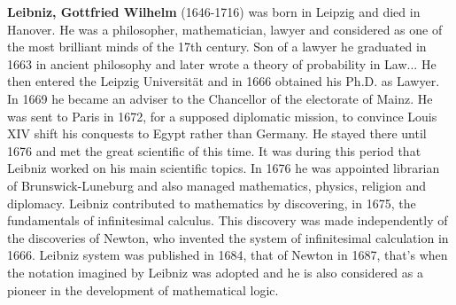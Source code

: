 \textbf{Leibniz, Gottfried Wilhelm} (1646-1716) was born in Leipzig and died in Hanover. He was a philosopher, mathematician, lawyer and considered as one of the most brilliant minds of the 17th century. Son of a lawyer he graduated in 1663 in ancient philosophy and later wrote a theory of probability in Law... He then entered the Leipzig Universität and in 1666 obtained his Ph.D. as Lawyer. In 1669 he became an adviser to the Chancellor of the electorate of Mainz. He was sent to Paris in 1672, for a supposed diplomatic mission, to convince Louis XIV shift his conquests to Egypt rather than Germany. He stayed there until 1676 and met the great scientific of this time. It was during this period that Leibniz worked on his main scientific topics. In 1676 he was appointed librarian of Brunswick-Luneburg and also managed mathematics, physics, religion and diplomacy. Leibniz contributed to mathematics by discovering, in 1675, the fundamentals of infinitesimal calculus. This discovery was made independently of the discoveries of Newton, who invented the system of infinitesimal calculation in 1666. Leibniz system was published in 1684, that of Newton in 1687, that's when the notation imagined by Leibniz was adopted and he is also considered as a pioneer in the development of mathematical logic.

